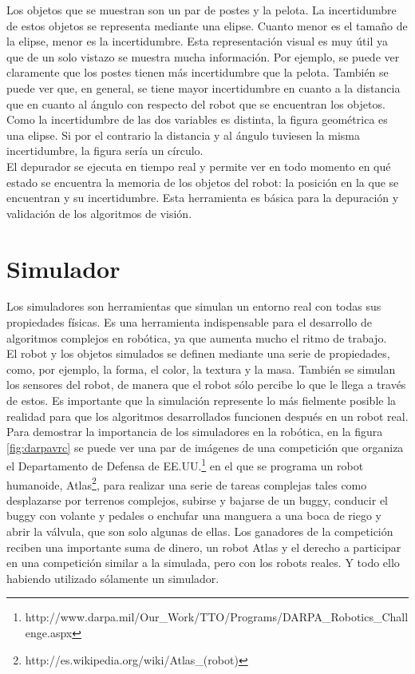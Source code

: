 Los objetos que se muestran son un par de postes y la pelota. La incertidumbre de estos objetos se representa mediante una elipse. Cuanto menor es el tamaño de la elipse, menor es la incertidumbre. Esta representación visual es muy útil ya que de un solo vistazo se muestra mucha información. Por ejemplo, se puede ver claramente que los postes tienen más incertidumbre que la pelota. También se puede ver que, en general, se tiene mayor incertidumbre en cuanto a la distancia que en cuanto al ángulo con respecto del robot que se encuentran los objetos. Como la incertidumbre de las dos variables es distinta, la figura geométrica es una elipse. Si por el contrario la distancia y al ángulo tuviesen la misma incertidumbre, la figura sería un círculo. \\

El depurador se ejecuta en tiempo real y permite ver en todo momento en qué estado se encuentra la memoria de los objetos del robot: la posición en la que se encuentran y su incertidumbre. Esta herramienta es básica para la depuración y validación de los algoritmos de visión.

\section{Simulador}
\label{sec:simulador}

Los simuladores son herramientas que simulan un entorno real con todas sus propiedades físicas. Es una herramienta indispensable para el desarrollo de algoritmos complejos en robótica, ya que aumenta mucho el ritmo de trabajo. \\

El robot y los objetos simulados se definen mediante una serie de propiedades, como, por ejemplo, la forma, el color, la textura y la masa. También se simulan los sensores del robot, de manera que el robot sólo percibe lo que le llega a través de estos. Es importante que la simulación represente lo más fielmente posible la realidad para que los algoritmos desarrollados funcionen después en un robot real. \\

Para demostrar la importancia de los simuladores en la robótica, en la figura \ref{fig:darpavrc} se puede ver una par de imágenes de una competición que organiza el Departamento de Defensa de EE.UU.\footnote{http://www.darpa.mil/Our\_Work/TTO/Programs/DARPA\_Robotics\_Challenge.aspx} en el que se programa un robot humanoide, Atlas\footnote{http://es.wikipedia.org/wiki/Atlas\_(robot)},  para realizar una serie de tareas complejas tales como desplazarse por terrenos complejos, subirse y bajarse de un buggy, conducir el buggy con volante y pedales o enchufar una manguera a una boca de riego y abrir la válvula, que son solo algunas de ellas. Los ganadores de la competición reciben una importante suma de dinero, un robot Atlas y el derecho a participar en una competición similar a la simulada, pero con los robots reales. Y todo ello habiendo utilizado sólamente un simulador. \\

